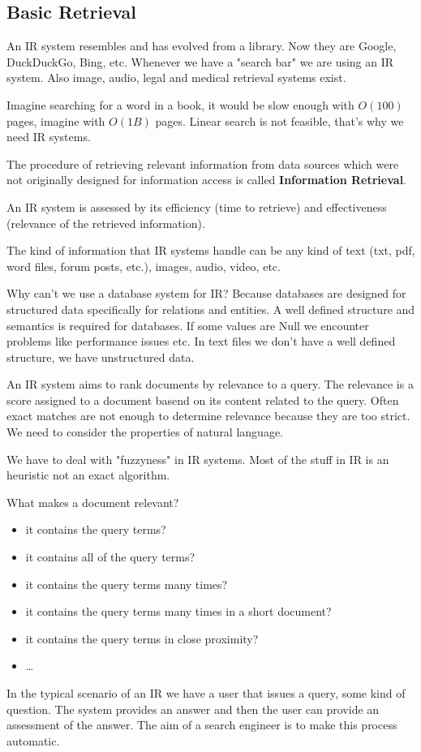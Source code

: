 \subsection{Basic Retrieval}
\label{sec:basic_retrieval}

An IR system resembles and has evolved from a library.
Now they are Google, DuckDuckGo, Bing, etc.
Whenever we have a "search bar" we are using an IR system.
Also image, audio, legal and medical retrieval systems exist.

Imagine searching for a word in a book, it would be
slow enough with $O(100)$ pages, imagine with $O(1B)$ pages.
Linear search is not feasible, that's why we need IR systems.

The procedure of retrieving relevant information from data sources
which were not originally designed for information access is called
\textbf{Information Retrieval}.

An IR system is assessed by its efficiency (time to retrieve) and
effectiveness (relevance of the retrieved information).

The kind of information that IR systems handle can be any kind
of text (txt, pdf, word files, forum posts, etc.), images, audio,
video, etc.

Why can't we use a database system for IR? Because databases are
designed for structured data specifically for relations and entities.
A well defined structure and semantics is required for databases.
If some values are Null we encounter problems like performance 
issues etc.
In text files we don't have a well defined structure, we have
unstructured data.

An IR system aims to rank documents by relevance to a query.
The relevance is a score assigned to a document basend on its
content related to the query.
Often exact matches are not enough to determine relevance
because they are too strict. We need to consider the properties
of natural language.

We have to deal with "fuzzyness" in IR systems.
Most of the stuff in IR is an heuristic not an exact algorithm.

What makes a document relevant?
\begin{itemize}
    \item it contains the query terms?
    \item it contains all of the query terms?
    \item it contains the query terms many times?
    \item it contains the query terms many times in a short document?
    \item it contains the query terms in close proximity?
    \item \dots
\end{itemize}

In the typical scenario of an IR we have a user that issues a query,
some kind of question. The system provides an answer and then the user
can provide an assessment of the answer. The aim of a search engineer
is to make this process automatic.
